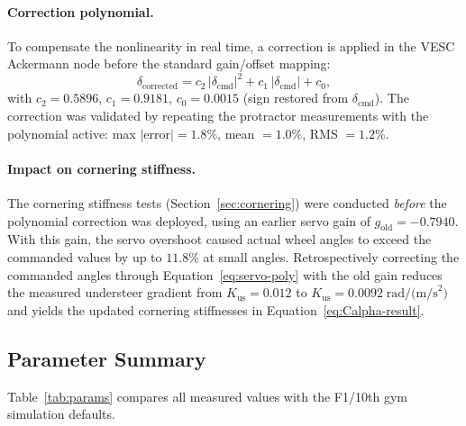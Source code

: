 \documentclass[11pt,a4paper]{article}
\begin{document}
\paragraph{Correction polynomial.}
To compensate the nonlinearity in real time, a correction is applied
in the VESC Ackermann node before the standard gain/offset mapping:
\begin{equation}\label{eq:servo-correction}
  \delta_\text{corrected} = c_2\,|\delta_\text{cmd}|^2
    + c_1\,|\delta_\text{cmd}| + c_0,
\end{equation}
with $c_2 = 0.5896$, $c_1 = 0.9181$, $c_0 = 0.0015$
(sign restored from $\delta_\text{cmd}$).
The correction was validated by repeating the protractor measurements
with the polynomial active:
max $|\text{error}| = 1.8\%$, mean $= 1.0\%$, RMS $= 1.2\%$.

\paragraph{Impact on cornering stiffness.}
The cornering stiffness tests (Section~\ref{sec:cornering}) were
conducted \emph{before} the polynomial correction was deployed, using
an earlier servo gain of $g_\text{old} = -0.7940$.
With this gain, the servo overshoot caused actual wheel angles to
exceed the commanded values by up to $11.8\%$ at small angles.
Retrospectively correcting the commanded angles through
Equation~\eqref{eq:servo-poly} with the old gain reduces the measured
understeer gradient from $K_\text{us} = 0.012$ to
$K_\text{us} = 0.0092\;\text{rad/(m/s}^2\text{)}$ and yields the
updated cornering stiffnesses in Equation~\eqref{eq:Calpha-result}.

\subsection{Parameter Summary}\label{sec:param-summary}

Table~\ref{tab:params} compares all measured values with the F1/10th
gym simulation defaults.
\end{document}
